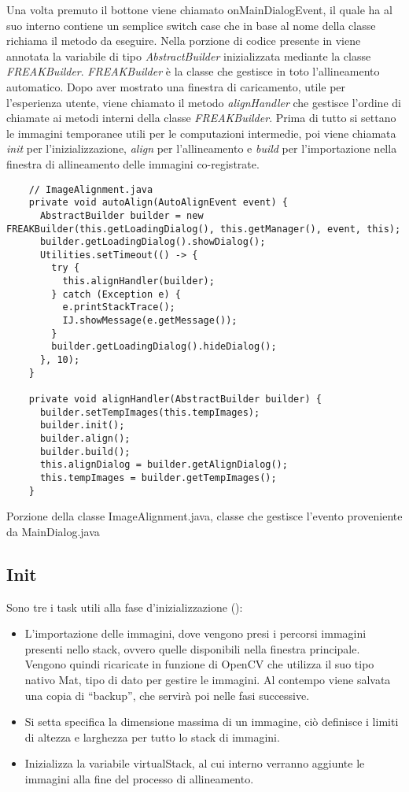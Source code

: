 \noindent Una volta premuto il bottone viene chiamato onMainDialogEvent, il quale ha al suo interno contiene un semplice switch case che in base al nome della classe richiama il metodo da eseguire. Nella porzione di codice presente in  viene annotata la variabile di tipo \textit{AbstractBuilder} inizializzata mediante la classe \textit{FREAKBuilder}. \textit{FREAKBuilder} è la classe che gestisce in toto l'allineamento automatico. Dopo aver mostrato una finestra di caricamento, utile per l'esperienza utente, viene chiamato il metodo \textit{alignHandler} che gestisce l'ordine di chiamate ai metodi interni della classe \textit{FREAKBuilder}. Prima di tutto si settano le immagini temporanee utili per le computazioni intermedie, poi viene chiamata \textit{init} per l'inizializzazione, \textit{align} per l'allineamento e \textit{build} per l'importazione nella finestra di allineamento delle immagini co-registrate. 

\begin{listing}[H]
\begin{verbatim}
    // ImageAlignment.java
    private void autoAlign(AutoAlignEvent event) {
      AbstractBuilder builder = new FREAKBuilder(this.getLoadingDialog(), this.getManager(), event, this);
      builder.getLoadingDialog().showDialog();
      Utilities.setTimeout(() -> {
        try {
          this.alignHandler(builder);
        } catch (Exception e) {
          e.printStackTrace();
          IJ.showMessage(e.getMessage());
        }
        builder.getLoadingDialog().hideDialog();
      }, 10);
    }
    
    private void alignHandler(AbstractBuilder builder) {
      builder.setTempImages(this.tempImages);
      builder.init();
      builder.align();
      builder.build();
      this.alignDialog = builder.getAlignDialog();
      this.tempImages = builder.getTempImages();
    }
\end{verbatim}
\caption{Porzione della classe ImageAlignment.java, classe che gestisce l'evento proveniente da MainDialog.java}\label{lst:autoAlignEvemt}
\end{listing}


\subsection{Init}
\noindent Sono tre i task utili alla fase d'inizializzazione ():
\begin{itemize}
    \item L'importazione delle immagini, dove vengono presi i percorsi immagini presenti nello stack, ovvero quelle disponibili nella finestra principale. Vengono quindi ricaricate in funzione di OpenCV che utilizza il suo tipo nativo Mat, tipo di dato per gestire le immagini. Al contempo viene salvata una copia di ``backup'', che servirà poi nelle fasi successive.
    \item Si setta specifica la dimensione massima di un immagine, ciò definisce i limiti di altezza e larghezza per tutto lo stack di immagini.
    \item Inizializza la variabile virtualStack, al cui interno verranno aggiunte le immagini alla fine del processo di allineamento.
\end{itemize}

